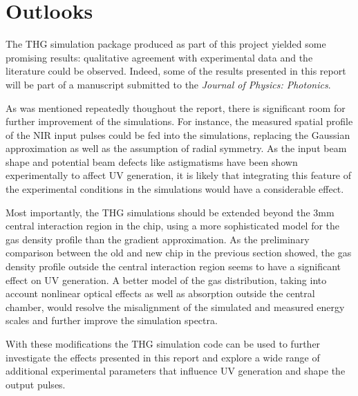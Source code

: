 \documentclass[a4paper]{jpconf}
\begin{document}
\section{Outlooks}
The THG simulation package produced as part of this project yielded some promising results: qualitative agreement with experimental data and the literature could be observed. Indeed, some of the results presented in this report will be part of a manuscript submitted to the \textit{Journal of Physics: Photonics}. \par 
As was mentioned repeatedly thoughout the report, there is significant room for further improvement of the simulations. For instance, the measured spatial profile of the NIR input pulses could be fed into the simulations, replacing the Gaussian approximation as well as the assumption of radial symmetry. As the input beam shape and potential beam defects like astigmatisms have been shown experimentally to affect UV generation, it is likely that integrating this feature of the experimental conditions in the simulations would have a considerable effect. \par 
Most importantly, the THG simulations should be extended beyond the 3mm central interaction region in the chip, using a more sophisticated model for the gas density profile than the gradient approximation. As the preliminary comparison between the old and new chip in the previous section showed, the gas density profile outside the central interaction region seems to have a significant effect on UV generation.  A better model of the gas distribution, taking into account nonlinear optical effects as well as absorption outside the central chamber, would resolve the misalignment of the simulated and measured energy scales and further improve the simulation spectra. \par 
With these modifications the THG simulation code can be used to further investigate the effects presented in this report and explore a wide range of additional experimental parameters that influence UV generation and shape the output pulses.
\end{document}
